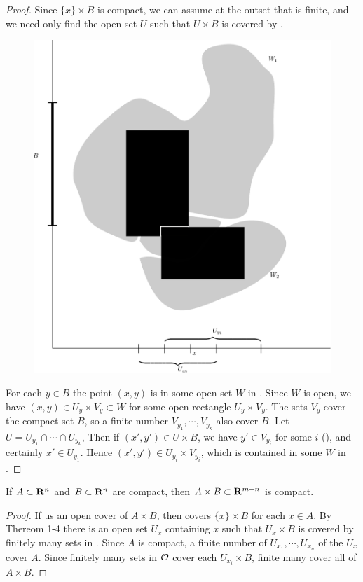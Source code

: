 \begin{proof}
    Since $\{x\} \times B$ is compact, we can assume at the
    outset that  is finite, and we need only find the open set $U$
    such that $U \times B$ is covered by .

    \begin{figure}[t]
        \centering
        \includegraphics[width=.75\linewidth]{./pics/Fig1-4.pdf}
        \caption{}
        \label{Fig 1-4}
    \end{figure}

    For each $y\in B$ the point $(x, y)$ is in some open set $W$ in .
    Since $W$ is open, we have $(x, y) \in U_y\times V_y\subset W$ for some 
    open rectangle $U_y\times V_y$. The sets $V_y$ cover the compact set $B$,
    so a finite  number $V_{y_1},\cdots, V_{y_k}$ also cover $B$. Let 
    $U = U_{y_1}\cap\cdots\cap U_{y_k}$, Then if $(x', y') \in U\times B$, 
    we have $y'\in V_{y_i}$ for some $i$ (), and certainly $x'\in U_{y_1}$.
    Hence $(x', y')\in U_{y_i}\times V_{y_i}$, which is contained in some $W$ in .
\end{proof}

\begin{corollary}
    If $A\subset \mathbf{R}^n$ and $B\subset \mathbf{R}^n$ are compact, then 
    $A\times B\subset \mathbf{R}^{m+n}$ is compact. 
\end{corollary}

\begin{proof}
    If  us an open cover of $A\times B$, then  covers $\{x\}\times B$ 
    for each $x\in A$. By Thereom 1-4 there is an open set $U_x$ containing 
    $x$ such that $U_x\times B$ is covered by finitely many sets in .
    Since $A$ is compact, a finite number of $U_{x_1}, \cdots, U_{x_n}$ of 
    the $U_x$ cover $A$. Since finitely many sets in $\mathcal{O}$ cover each $U_{x_i}\times B$,
    finite many cover all of $A\times B$. 
\end{proof}

